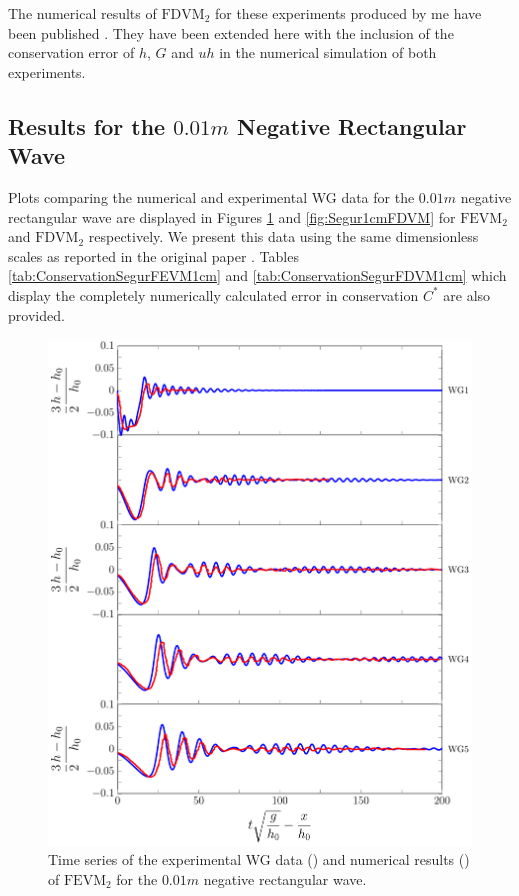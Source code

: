 The numerical results of $\text{FDVM}_2$ for these experiments produced by me have been published \cite{Zoppou-etal-2017}. They have been extended here with the inclusion of the conservation error of $h$, $G$ and $uh$ in the numerical simulation of both experiments.

\subsection{Results for the $0.01m$ Negative Rectangular Wave}

Plots comparing the numerical and experimental WG data for the $0.01m$ negative rectangular wave are displayed in Figures \ref{fig:Segur1cmFEVM} and \ref{fig:Segur1cmFDVM} for $\text{FEVM}_2$ and $\text{FDVM}_2$ respectively. We present this data using the same dimensionless scales as reported in the original paper \cite{Hammack-Segur-1978-337}. Tables \ref{tab:ConservationSegurFEVM1cm} and \ref{tab:ConservationSegurFDVM1cm} which display the completely numerically calculated error in conservation $C^*$ are also provided. 
\begin{figure}
	\centering
	\includegraphics[width=\textwidth]{./chp6/figures/Experiment/Segur/LongWGsFEVM1cm.pdf}
	\caption{Time series of the experimental WG data ({\color{red}\solidrule}) and numerical results ({\color{blue}\solidrule}) of $\text{FEVM}_2$ for the $0.01m$ negative rectangular wave.}
	\label{fig:Segur1cmFEVM}
\end{figure}
